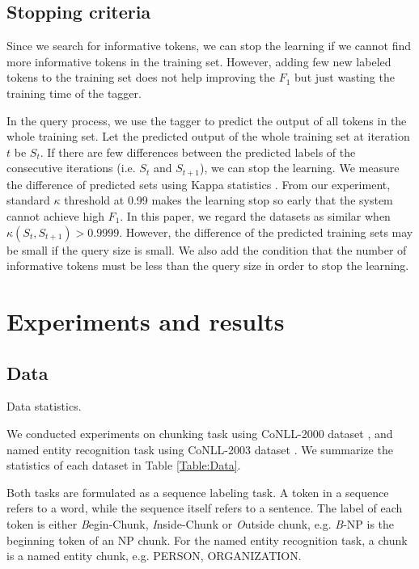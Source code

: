 \documentclass[english]{jnlp_JS2.0}
\begin{document}
\subsection{Stopping criteria}

Since we search for informative tokens, we can stop the learning if we cannot find more informative tokens in the training set. However, adding few new labeled tokens to the training set does not help improving the $F_1$ but just wasting the training time of the tagger.

In the query process, we use the tagger to predict the output of all tokens in the whole training set. Let the predicted output of the whole training set at iteration $t$ be $S_t$. If there are few differences between the predicted labels of the consecutive iterations (i.e. $S_t$ and $S_{t+1}$), we can stop the learning. We measure the difference of predicted sets using Kappa statistics \cite{Bloodgood2009}. From our experiment, standard $\kappa$ threshold at 0.99 makes the learning stop so early that the system cannot achieve high $F_1$. In this paper, we regard the datasets as similar when $\kappa(S_t,S_{t+1}) > 0.9999$. However, the difference of the predicted training sets may be small if the query size is small. We also add the condition that the number of informative tokens must be less than the query size in order to stop the learning.



\section{Experiments and results}
\label{Sec:Experiments}

\subsection{Data}

\begin{table}[b]
	\caption{Data statistics.}
	\label{Table:Data}

\end{table}

We conducted experiments on chunking task using CoNLL-2000 dataset \cite{CoNLL2000}, and named entity recognition task using CoNLL-2003 dataset \cite{CoNLL2003}. We summarize the statistics of each dataset in Table \ref{Table:Data}.

Both tasks are formulated as a sequence labeling task. A token in a sequence refers to a word, while the sequence itself refers to a sentence. The label of each token is either \textit{B}egin-Chunk, \textit{I}nside-Chunk or \textit{O}utside chunk, e.g. \textit{B}-NP is the beginning token of an NP chunk. For the named entity recognition task, a chunk is a named entity chunk, e.g. PERSON, ORGANIZATION.
\end{document}
